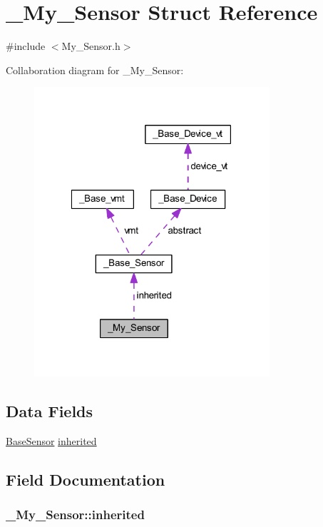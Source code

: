 \hypertarget{struct___my___sensor}{\section{\-\_\-\-My\-\_\-\-Sensor Struct Reference}
\label{struct___my___sensor}
}


{\ttfamily \#include $<$My\-\_\-\-Sensor.\-h$>$}



Collaboration diagram for \-\_\-\-My\-\_\-\-Sensor\-:
\nopagebreak
\begin{figure}[H]
\begin{center}
\leavevmode
\includegraphics[width=247pt]{struct___my___sensor__coll__graph}
\end{center}
\end{figure}
\subsection*{Data Fields}
\begin{DoxyCompactItemize}
\item 
\hyperlink{_base___sensor_8h_ae91aa07b7bce6c6b463d63d8f214bb37}{Base\-Sensor} \hyperlink{struct___my___sensor_abcbafe15ac0db03286d064456a15e2ad}{inherited}
\end{DoxyCompactItemize}


\subsection{Field Documentation}
\hypertarget{struct___my___sensor_abcbafe15ac0db03286d064456a15e2ad}{
\subsubsection[{inherited}]{ \-\_\-\-My\-\_\-\-Sensor\-::inherited}}\label{struct___my___sensor_abcbafe15ac0db03286d064456a15e2ad}


